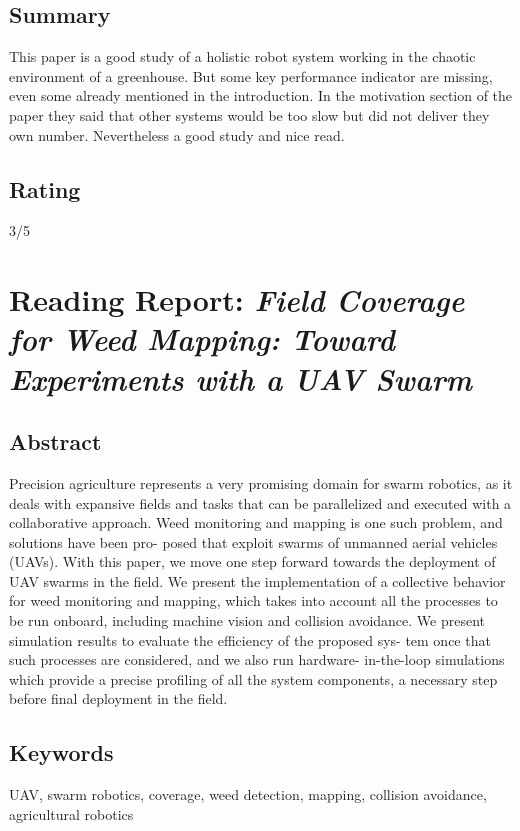 \subsection*{Summary}
This paper is a good study of a holistic robot system working in the chaotic environment of a greenhouse. But some key performance indicator are missing, even some already mentioned in the introduction. 
In the motivation section of the paper they said that other systems would be too slow but did not deliver they own number. Nevertheless a good study and nice read.

\subsection*{Rating}
3/5

\section{Reading Report: \emph{Field Coverage for Weed Mapping: Toward Experiments with a UAV Swarm}}
\cite{Albani2019}

\subsection*{Abstract}
Precision agriculture represents a very promising domain for
swarm robotics, as it deals with expansive fields and tasks that can be
parallelized and executed with a collaborative approach. Weed monitoring and mapping is one such problem, and solutions have been pro-
posed that exploit swarms of unmanned aerial vehicles (UAVs). With this
paper, we move one step forward towards the deployment of UAV swarms
in the field. We present the implementation of a collective behavior for
weed monitoring and mapping, which takes into account all the processes
to be run onboard, including machine vision and collision avoidance. We
present simulation results to evaluate the efficiency of the proposed sys-
tem once that such processes are considered, and we also run hardware-
in-the-loop simulations which provide a precise profiling of all the system
components, a necessary step before final deployment in the field.

\subsection*{Keywords}
UAV, swarm robotics, coverage, weed detection, mapping, collision avoidance, agricultural robotics

